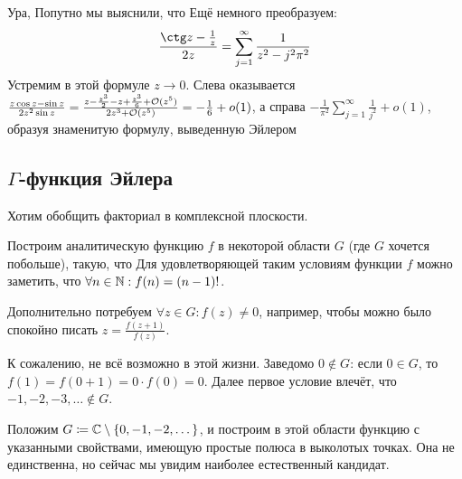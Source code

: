 \documentclass[a4paper]{report}
\begin{document}
    Ура,
    Попутно мы выяснили, что 
    Ещё немного преобразуем:
    \[\frac{\ctg z - \frac{1}{z}}{2 z} = \sum\limits_{j = 1}^{\infty}\frac{1}{z^2 - j^2\pi^2}\]
    Устремим в этой формуле $z \to 0$.
    Слева оказывается $\frac{z \cos z - \sin z}{2 z^2 \sin z} = \frac{z - \frac{z^3}{2} - z + \frac{z^3}{6} + \mathcal{O}(z^5)}{2z^3 + \mathcal{O}(z^5)} = -\frac{1}{6} + o(1)$, а справа $-\frac{1}{\pi^2}\sum\limits_{j = 1}^{\infty}\frac{1}{j^2} + o(1)$, образуя знаменитую формулу, выведенную Эйлером
    \subsection{$\Gamma$-функция Эйлера}
    \label{gamma}
    Хотим обобщить факториал в комплексной плоскости.

    Построим аналитическую функцию $f$ в некоторой области $G$ (где $G$ хочется побольше), такую, что
    Для удовлетворяющей таким условиям функции $f$ можно заметить, что $\forall n \in \mathbb{N}: f(n) = (n - 1)!$.

    Дополнительно потребуем $\forall z \in G: f(z) \ne 0$, например, чтобы можно было спокойно писать $z = \frac{f(z + 1)}{f(z)}$.

    К сожалению, не всё возможно в этой жизни.
    Заведомо $0 \notin G$: если $0 \in G$, то $f(1) = f(0 + 1) = 0 \cdot f(0) = 0$.
    Далее первое условие влечёт, что $-1, -2, -3, \dots \notin G$.

    Положим $G \coloneqq \mathbb{C} \setminus \{0, -1, -2, \dots\}$, и построим в этой области функцию с указанными свойствами, имеющую простые полюса в выколотых точках.
    Она не единственна, но сейчас мы увидим наиболее естественный кандидат.
\end{document}
